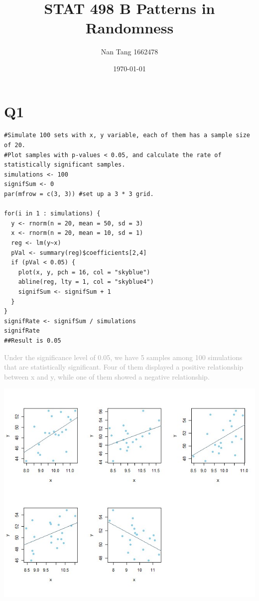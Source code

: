 \documentclass[12pt]{article}
\begin{document}
\title{STAT 498 B Patterns in Randomness}
\author{Nan Tang 1662478}
\date{\today}
\maketitle

\section*{Q1}
\begin{verbatim}
#Simulate 100 sets with x, y variable, each of them has a sample size of 20.
#Plot samples with p-values < 0.05, and calculate the rate of statistically significant samples.
simulations <- 100
signifSum <- 0
par(mfrow = c(3, 3)) #set up a 3 * 3 grid.

for(i in 1 : simulations) {
  y <- rnorm(n = 20, mean = 50, sd = 3)
  x <- rnorm(n = 20, mean = 10, sd = 1)
  reg <- lm(y~x)
  pVal <- summary(reg)$coefficients[2,4]
  if (pVal < 0.05) {
    plot(x, y, pch = 16, col = "skyblue")
    abline(reg, lty = 1, col = "skyblue4")
    signifSum <- signifSum + 1
  }
}
signifRate <- signifSum / simulations
signifRate
##Result is 0.05
\end{verbatim}

\noindent \textcolor{darkgray}{Under the significance level of 0.05, we have 5 samples among 100 simulations that are statistically significant. Four of them displayed a positive relationship between x and y, while one of them showed a negative relationship.}

\includegraphics[width = 6 in]{RandPlot1-pv005.jpg}
\end{document}
